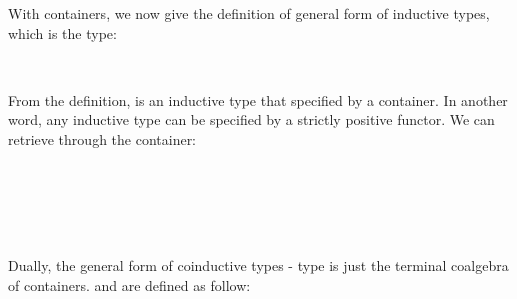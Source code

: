 With containers, we now give the definition of general form of inductive types, which is the  type:

\begin{code}%
\>[0]\AgdaSpace{}%
\AgdaSpace{}%
\AgdaSymbol{(}\AgdaSpace{}%
\AgdaSymbol{:}\AgdaSpace{}%
\AgdaSymbol{)}\AgdaSpace{}%
\AgdaSymbol{:}\AgdaSpace{}%
\AgdaSpace{}%
\<%
\\
\>[0][@{}l@{\AgdaIndent{0}}]%
\>[2]\AgdaSpace{}%
\AgdaSymbol{:}\AgdaSpace{}%
\AgdaSpace{}%
\AgdaSpace{}%
\AgdaSpace{}%
\AgdaSymbol{(}\AgdaSpace{}%
\AgdaSymbol{)}\AgdaSpace{}%
\AgdaSpace{}%
\AgdaSpace{}%
\<%
\end{code}

From the definition,  is an inductive type that specified by a container. In another word, any inductive type can be specified by a strictly positive functor. We can retrieve  through the  container:

\begin{code}%
\>[0]\AgdaSpace{}%
\AgdaSymbol{:}\AgdaSpace{}%
\<%
\\
\>[0]\AgdaSpace{}%
\AgdaSymbol{=}\AgdaSpace{}%
\AgdaSymbol{(}\AgdaSpace{}%
\AgdaSpace{}%
\AgdaSymbol{)}\AgdaSpace{}%
\AgdaSpace{}%
\AgdaSpace{}%
\AgdaSymbol{(}\AgdaSpace{}%
\AgdaSymbol{)}\AgdaSpace{}%
\AgdaSpace{}%
\AgdaSpace{}%
\AgdaSymbol{;}\AgdaSpace{}%
\AgdaSymbol{(}\AgdaSpace{}%
\AgdaSymbol{)}\AgdaSpace{}%
\AgdaSpace{}%
\AgdaSpace{}%
\AgdaSymbol{\}}\<%
\\
%
\\[\AgdaEmptyExtraSkip]%
\>[0]\AgdaSpace{}%
\AgdaSymbol{:}\AgdaSpace{}%
\<%
\\
\>[0]\AgdaSpace{}%
\AgdaSymbol{=}\AgdaSpace{}%
\AgdaSpace{}%
\<%
\end{code}

Dually, the general form of coinductive types -  type is just the terminal coalgebra of containers.  and  are defined as follow:

